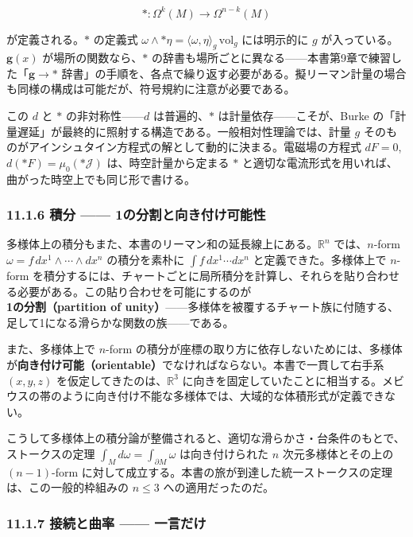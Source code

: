 \documentclass[a4paper,12pt,openany]{book}
\begin{document}
\[\ast: \Omega^k(M) \to \Omega^{n-k}(M)\]

が定義される。\(\ast\) の定義式
\(\omega \wedge \ast\eta = \langle\omega,\eta\rangle_g\,\mathrm{vol}_g\)
には明示的に \(g\) が入っている。\(\mathbf{g}(x)\)
が場所の関数なら、\(\ast\)
の辞書も場所ごとに異なる——本書第9章で練習した「\(\mathbf{g} \to \ast\)
辞書」の手順を、各点で繰り返す必要がある。擬リーマン計量の場合も同様の構成は可能だが、符号規約に注意が必要である。

この \(d\) と \(\ast\) の非対称性——\(d\) は普遍的、\(\ast\)
は計量依存——こそが、Burke
の「計量遅延」が最終的に照射する構造である。一般相対性理論では、計量
\(g\)
そのものがアインシュタイン方程式の解として動的に決まる。電磁場の方程式
\(dF = 0\), \(d(\ast F) = \mu_0(\ast\mathcal{J})\)
は、時空計量から定まる \(\ast\)
と適切な電流形式を用いれば、曲がった時空上でも同じ形で書ける。

\hypertarget{ux7a4dux5206-1ux306eux5206ux5272ux3068ux5411ux304dux4ed8ux3051ux53efux80fdux6027}{%
\subsubsection{11.1.6 積分 ——
1の分割と向き付け可能性}\label{ux7a4dux5206-1ux306eux5206ux5272ux3068ux5411ux304dux4ed8ux3051ux53efux80fdux6027}}

多様体上の積分もまた、本書のリーマン和の延長線上にある。\(\mathbb{R}^n\)
では、\(n\)-form \(\omega = f\,dx^1 \wedge \cdots \wedge dx^n\)
の積分を素朴に \(\int f\,dx^1 \cdots dx^n\) と定義できた。多様体上で
\(n\)-form
を積分するには、チャートごとに局所積分を計算し、それらを貼り合わせる必要がある。この貼り合わせを可能にするのが\textbf{1の分割（partition of unity）}——多様体を被覆するチャート族に付随する、足して1になる滑らかな関数の族——である。

また、多様体上で \(n\)-form
の積分が座標の取り方に依存しないためには、多様体が\textbf{向き付け可能（orientable）}でなければならない。本書で一貫して右手系
\((x,y,z)\) を仮定してきたのは、\(\mathbb{R}^3\)
に向きを固定していたことに相当する。メビウスの帯のように向き付け不能な多様体では、大域的な体積形式が定義できない。

こうして多様体上の積分論が整備されると、適切な滑らかさ・台条件のもとで、ストークスの定理
\(\int_M d\omega = \int_{\partial M} \omega\) は向き付けられた \(n\)
次元多様体とその上の \((n-1)\)-form
に対して成立する。本書の旅が到達した統一ストークスの定理は、この一般的枠組みの
\(n \le 3\) への適用だったのだ。

\hypertarget{ux63a5ux7d9aux3068ux66f2ux7387-ux4e00ux8a00ux3060ux3051}{%
\subsubsection{11.1.7 接続と曲率 ——
一言だけ}\label{ux63a5ux7d9aux3068ux66f2ux7387-ux4e00ux8a00ux3060ux3051}}
\end{document}
